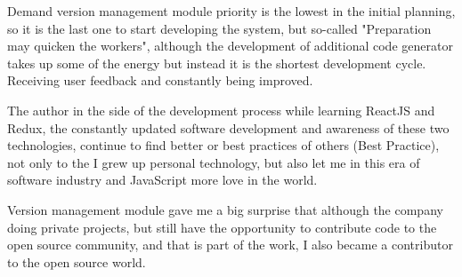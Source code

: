 Demand version management module priority is the lowest in the initial planning, so it is the last one to start developing the system, but so-called "Preparation may quicken the workers", although the development of additional code generator takes up some of the energy but instead it is the shortest development cycle. Receiving user feedback and constantly being improved.

The author in the side of the development process while learning ReactJS and Redux, the constantly updated software development and awareness of these two technologies, continue to find better or best practices of others (Best Practice), not only to the I grew up personal technology, but also let me in this era of software industry and JavaScript more love in the world.

Version management module gave me a big surprise that although the company doing private projects, but still have the opportunity to contribute code to the open source community, and that is part of the work, I also became a contributor to the open source world.
